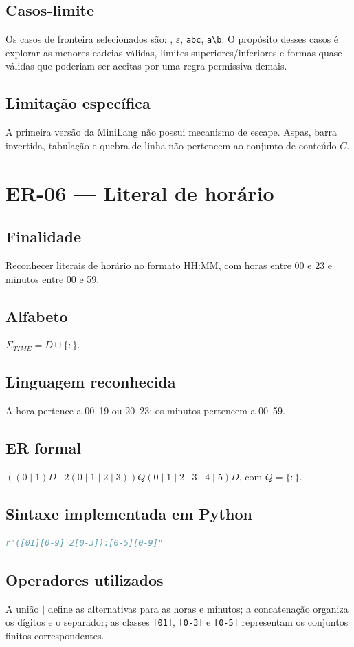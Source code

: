 \documentclass[12pt,a4paper,oneside]{report}
\begin{document}
\subsection{Casos-limite}
Os casos de fronteira selecionados são: \texttt{\textquotedbl{}\textquotedbl{}}, $\varepsilon$, \texttt{\textquotedbl{}abc}, \texttt{\textquotedbl{}a\textbackslash{}b\textquotedbl{}}.
\medskip
O propósito desses casos é explorar as menores cadeias válidas, limites superiores/inferiores e formas quase válidas que poderiam ser aceitas por uma regra permissiva demais.
\subsection{Limitação específica}
A primeira versão da MiniLang não possui mecanismo de escape. Aspas, barra invertida, tabulação e quebra de linha não pertencem ao conjunto de conteúdo \(C\).

\section{ER-06 --- Literal de horário}
\subsection{Finalidade}
Reconhecer literais de horário no formato HH:MM, com horas entre 00 e 23 e minutos entre 00 e 59.
\subsection{Alfabeto}
$\Sigma_{TIME}=D\cup\{:\}$.
\subsection{Linguagem reconhecida}
A hora pertence a 00--19 ou 20--23; os minutos pertencem a 00--59.
\subsection{ER formal}
$((0\mid1)D\mid2(0\mid1\mid2\mid3))Q(0\mid1\mid2\mid3\mid4\mid5)D$, com $Q=\{:\}$.
\subsection{Sintaxe implementada em Python}
\begin{lstlisting}[language=Python]
r"([01][0-9]|2[0-3]):[0-5][0-9]"
\end{lstlisting}
\subsection{Operadores utilizados}
A união $\mid$ define as alternativas para as horas e minutos; a concatenação organiza os dígitos e o separador; as classes \texttt{[01]}, \texttt{[0-3]} e \texttt{[0-5]} representam os conjuntos finitos correspondentes.
\end{document}

